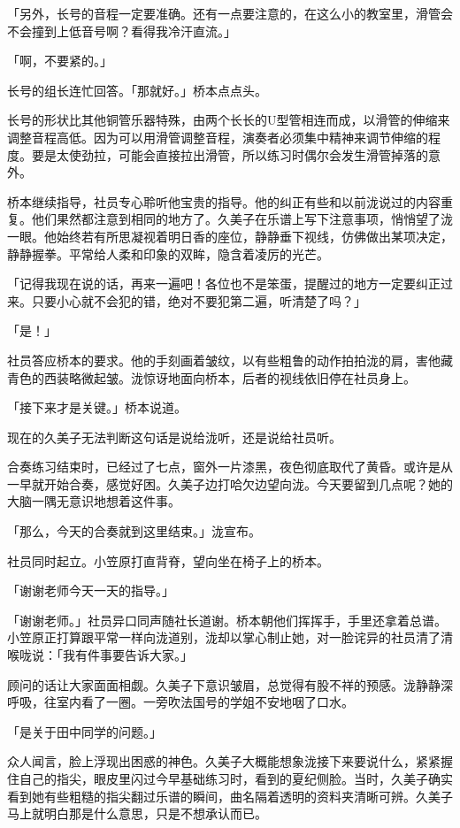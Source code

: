\documentclass[UTF8]{ctexart}
\begin{document}
    「另外，长号的音程一定要准确。还有一点要注意的，在这么小的教室里，滑管会不会撞到上低音号啊？看得我冷汗直流。」 

    「啊，不要紧的。」 

    长号的组长连忙回答。「那就好。」桥本点点头。 

    长号的形状比其他铜管乐器特殊，由两个长长的U型管相连而成，以滑管的伸缩来调整音程高低。因为可以用滑管调整音程，演奏者必须集中精神来调节伸缩的程度。要是太使劲拉，可能会直接拉出滑管，所以练习时偶尔会发生滑管掉落的意外。 

    桥本继续指导，社员专心聆听他宝贵的指导。他的纠正有些和以前泷说过的内容重复。他们果然都注意到相同的地方了。久美子在乐谱上写下注意事项，悄悄望了泷一眼。他始终若有所思凝视着明日香的座位，静静垂下视线，仿佛做出某项决定，静静握拳。平常给人柔和印象的双眸，隐含着凌厉的光芒。 

    「记得我现在说的话，再来一遍吧！各位也不是笨蛋，提醒过的地方一定要纠正过来。只要小心就不会犯的错，绝对不要犯第二遍，听清楚了吗？」 

    「是！」 

    社员答应桥本的要求。他的手刻画着皱纹，以有些粗鲁的动作拍拍泷的肩，害他藏青色的西装略微起皱。泷惊讶地面向桥本，后者的视线依旧停在社员身上。 

    「接下来才是关键。」桥本说道。 

    现在的久美子无法判断这句话是说给泷听，还是说给社员听。 

    合奏练习结束时，已经过了七点，窗外一片漆黑，夜色彻底取代了黄昏。或许是从一早就开始合奏，感觉好困。久美子边打哈欠边望向泷。今天要留到几点呢？她的大脑一隅无意识地想着这件事。 

    「那么，今天的合奏就到这里结束。」泷宣布。 

    社员同时起立。小笠原打直背脊，望向坐在椅子上的桥本。 

    「谢谢老师今天一天的指导。」 

    「谢谢老师。」社员异口同声随社长道谢。桥本朝他们挥挥手，手里还拿着总谱。小笠原正打算跟平常一样向泷道别，泷却以掌心制止她，对一脸诧异的社员清了清喉咙说：「我有件事要告诉大家。」 

    顾问的话让大家面面相觑。久美子下意识皱眉，总觉得有股不祥的预感。泷静静深呼吸，往室内看了一圈。一旁吹法国号的学姐不安地咽了口水。 

    「是关于田中同学的问题。」 

    众人闻言，脸上浮现出困惑的神色。久美子大概能想象泷接下来要说什么，紧紧握住自己的指尖，眼皮里闪过今早基础练习时，看到的夏纪侧脸。当时，久美子确实看到她有些粗糙的指尖翻过乐谱的瞬间，曲名隔着透明的资料夹清晰可辨。久美子马上就明白那是什么意思，只是不想承认而已。 
\end{document}
